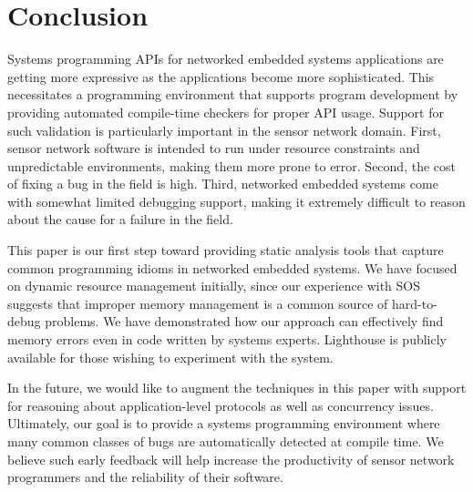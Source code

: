 \section{Conclusion}
\label{sec:conc}

Systems programming APIs for networked embedded systems applications
are getting more expressive as the applications become more
sophisticated.  This necessitates a programming environment that
supports program development by providing automated compile-time
checkers for proper API usage.  Support for such validation is
particularly important in the sensor network domain.  First,
sensor network software is intended to run under resource constraints
and unpredictable environments, making them more prone to error.
Second, the cost of fixing a bug in the field is
high.  Third, networked embedded systems come with somewhat limited
debugging support, making it extremely difficult to reason about the
cause for a failure in the field.

This paper is our first step toward providing static analysis tools
that capture common programming idioms in networked embedded systems.
We have focused on dynamic resource management initially, since our
experience with SOS suggests that improper memory management is a
common source of hard-to-debug problems.  We have demonstrated how our
approach can effectively find memory errors even in code written by
systems experts.  Lighthouse is publicly available for those wishing to
experiment with the system.

In the future, we would like to augment the techniques in this paper
with support for reasoning about application-level protocols
\cite{AlurPOPL05,HJM05} as well as concurrency issues.  Ultimately,
our goal is to provide a systems programming environment where many
common classes of bugs are automatically detected at compile time.  We
believe such early feedback will help increase the productivity of
sensor network programmers and the reliability of their software.


